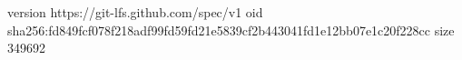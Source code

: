 version https://git-lfs.github.com/spec/v1
oid sha256:fd849fcf078f218adf99fd59fd21e5839cf2b443041fd1e12bb07e1c20f228cc
size 349692
